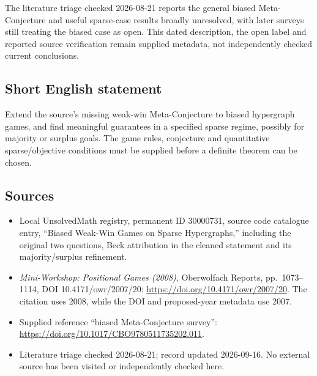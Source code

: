 \documentclass[11pt]{article}
\begin{document}
The literature triage checked 2026-08-21 reports the general biased Meta-Conjecture and useful sparse-case results broadly unresolved, with later surveys still treating the biased case as open. This dated description, the open label and reported source verification remain supplied metadata, not independently checked current conclusions.
\subsection{Short English statement}
Extend the source's missing weak-win Meta-Conjecture to biased hypergraph games, and find meaningful guarantees in a specified sparse regime, possibly for majority or surplus goals. The game rules, conjecture and quantitative sparse/objective conditions must be supplied before a definite theorem can be chosen.
\subsection{Sources}
\begin{itemize}
\item Local UnsolvedMath registry, permanent ID 30000731, source code catalogue entry, ``Biased Weak-Win Games on Sparse Hypergraphs,'' including the original two questions, Beck attribution in the cleaned statement and its majority/surplus refinement.
\item \emph{Mini-Workshop: Positional Games (2008)}, Oberwolfach Reports, pp.\ 1073--1114, DOI 10.4171/owr/2007/20: \url{https://doi.org/10.4171/owr/2007/20}. The citation uses 2008, while the DOI and proposed-year metadata use 2007.
\item Supplied reference ``biased Meta-Conjecture survey'': \url{https://doi.org/10.1017/CBO9780511735202.011}.
\item Literature triage checked 2026-08-21; record updated 2026-09-16. No external source has been visited or independently checked here.
\end{itemize}
\end{document}
